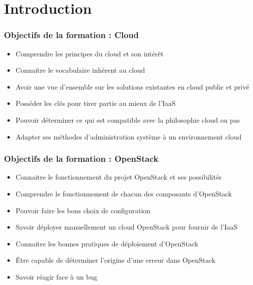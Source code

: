  \section*{Introduction}
  \begin{frame}
    \frametitle{Objectifs de la formation : Cloud}
    \begin{itemize}
      \item Comprendre les principes du cloud et son intérêt
      \item Connaitre le vocabulaire inhérent au cloud
      \item Avoir une vue d'ensemble sur les solutions existantes en cloud public et privé
      \item Posséder les clés pour tirer partie au mieux de l'IaaS
      \item Pouvoir déterminer ce qui est compatible avec la philosophie cloud ou pas
      \item Adapter ses méthodes d'administration système à un environnement cloud
    \end{itemize}
  \end{frame}

  \begin{frame}
    \frametitle{Objectifs de la formation : OpenStack}
    \begin{itemize}
      \item Connaitre le fonctionnement du projet OpenStack et ses possibilités
      \item Comprendre le fonctionnement de chacun des composants d'OpenStack
      \item Pouvoir faire les bons choix de configuration
      \item Savoir déployer manuellement un cloud OpenStack pour fournir de l'IaaS
      \item Connaitre les bonnes pratiques de déploiement d'OpenStack
      \item Être capable de déterminer l'origine d'une erreur dans OpenStack
      \item Savoir réagir face à un bug
    \end{itemize}
  \end{frame}

